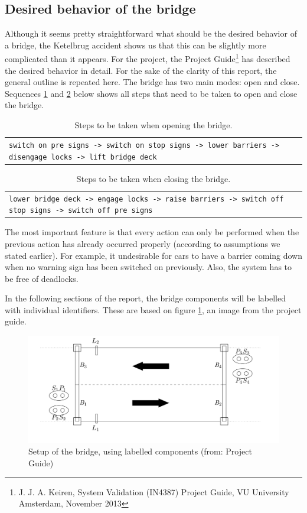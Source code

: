 \subsection{Desired behavior of the bridge}

Although it seems pretty straightforward what should be the desired behavior of a bridge, the Ketelbrug accident shows us that this can be slightly more complicated than it appears. For the project, the Project Guide\footnote{J. J. A. Keiren, System Validation (IN4387) Project Guide, VU University Amsterdam, November 2013} has described the desired behavior in detail. For the sake of the clarity of this report, the general outline is repeated here. The bridge has two main modes: open and close. Sequences \ref{tab:open} and \ref{tab:close} below shows all steps that need to be taken to open and close the bridge.
%
\begin{table}[h]%
\begin{tabular}{l}
	\footnotesize
	\texttt{switch on pre signs -> switch on stop signs -> lower barriers -> disengage locks -> lift bridge deck}\\
\end{tabular}
\caption{Steps to be taken when opening the bridge.}
\label{tab:open}
\end{table}
%
\begin{table}[h]%
\begin{tabular}{l}
	\footnotesize
	\texttt{lower bridge deck -> engage locks -> raise barriers -> switch off stop signs -> switch off pre signs}\\
\end{tabular}
\caption{Steps to be taken when closing the bridge.}
\label{tab:close}
\end{table}
%
The most important feature is that every action can only be performed when the previous action has already occurred properly (according to assumptions we stated earlier). For example, it undesirable for cars to have a barrier coming down when no warning sign has been switched on previously. Also, the system has to be free of deadlocks.

In the following sections of the report, the bridge components will be labelled with individual identifiers. These are based on figure \ref{fig:setup}, an image from the project guide.
%
\begin{figure}[htb]%
\includegraphics[width=\columnwidth]{Images/Setup.png}%
\caption{Setup of the bridge, using labelled components (from: Project Guide)}%
\label{fig:setup}%
\end{figure}
%

\newpage
